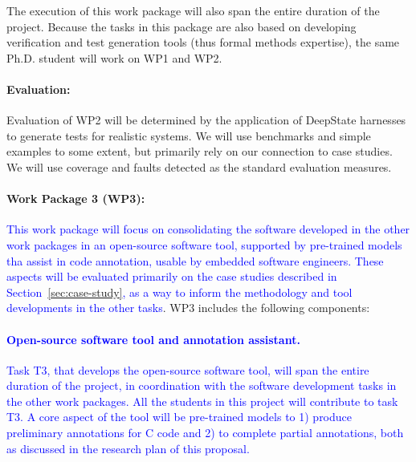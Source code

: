 The execution of this work package will also span the entire duration of the project.
Because the tasks in this package are also based on developing
verification and test generation tools (thus formal methods
expertise), the same Ph.D. student will work on WP1 and WP2. 

\paragraph{Evaluation:} Evaluation of
WP2 will be determined by the application
of DeepState harnesses to generate tests for realistic
systems.  We will use benchmarks and simple examples to some
extent, but primarily rely on our connection to case studies.
We will use coverage and faults
detected as the standard evaluation  measures.

\paragraph{Work Package 3 (WP3):}
\textcolor{blue}{%
This work package will focus on consolidating the software developed
in the other work packages in an open-source software tool, supported
by pre-trained models tha assist in code annotation, usable by embedded
software engineers.  These aspects will be evaluated primarily on the case studies described in Section~\ref{sec:case-study}, as a way to inform the methodology and tool developments in the other tasks}.
WP3 includes the following components:
\textcolor{blue}{%
\paragraph{Open-source software tool and annotation assistant.}
Task T3, that develops the open-source software tool, will span the
entire duration of the project, in coordination with the software
development tasks in the other work packages.  All the students in
this project will contribute to task T3.  A core aspect of the tool
will be pre-trained models to 1) produce preliminary annotations for C
code and 2) to complete partial annotations, both as discussed in the
research plan of this proposal.}


